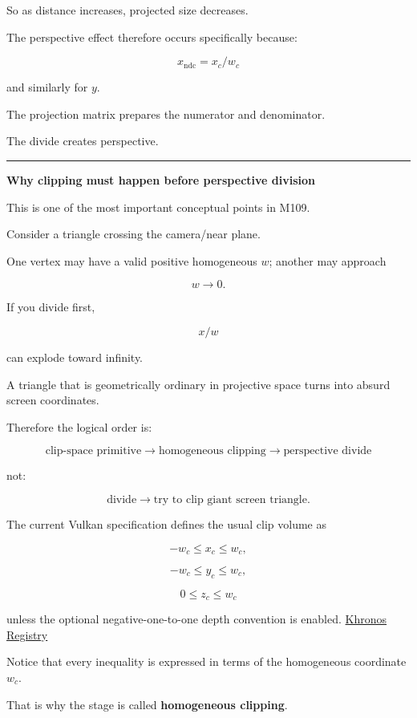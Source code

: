 So as distance increases, projected size decreases.

The perspective effect therefore occurs specifically because:

\[
\boxed{x_{\text{ndc}} = x_c/w_c}
\]

and similarly for \(y\).

The projection matrix prepares the numerator and denominator.

The divide creates perspective.

\begin{center}\rule{0.5\linewidth}{0.5pt}\end{center}

\textbf{Why clipping must happen before perspective division}

This is one of the most important conceptual points in M109.

Consider a triangle crossing the camera/near plane.

One vertex may have a valid positive homogeneous \(w\); another may approach

\[
w\rightarrow0.
\]

If you divide first,

\[
x/w
\]

can explode toward infinity.

A triangle that is geometrically ordinary in projective space turns into absurd screen coordinates.

Therefore the logical order is:

\[
\boxed{
\text{clip-space primitive}
\rightarrow
\text{homogeneous clipping}
\rightarrow
\text{perspective divide}
}
\]

not:

\[
\text{divide}
\rightarrow
\text{try to clip giant screen triangle}.
\]

The current Vulkan specification defines the usual clip volume as

\[
-w_c\le x_c\le w_c,
\]

\[
-w_c\le y_c\le w_c,
\]

\[
0\le z_c\le w_c
\]

unless the optional negative-one-to-one depth convention is enabled. \href{https://registry.khronos.org/vulkan/specs/latest-ratified/pdf/vkspec.pdf?utm_source=chatgpt.com}{Khronos Registry}

Notice that every inequality is expressed in terms of the homogeneous coordinate \(w_c\).

That is why the stage is called \textbf{homogeneous clipping}.

